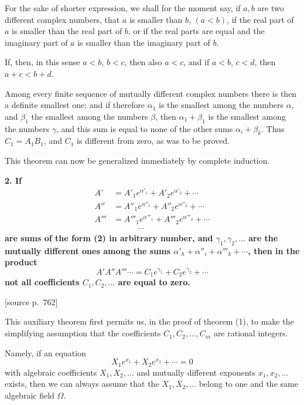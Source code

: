 \documentclass[11pt]{article}
\newcommand{\srcpage}[1]{\par\medskip\noindent\textsf{[source p.~#1]}\par\smallskip}
\begin{document}
For the sake of shorter expression, we shall for the moment say, if $a,b$ are two different complex numbers, that $a$ is smaller than $b$, $(a<b)$, if the real part of $a$ is smaller than the real part of $b$, or if the real parts are equal and the imaginary part of $a$ is smaller than the imaginary part of $b$.

If, then, in this sense $a<b$, $b<c$, then also $a<c$, and if $a<b$, $c<d$, then $a+c<b+d$.

Among every finite sequence of mutually different complex numbers there is then a definite smallest one; and if therefore $\alpha_1$ is the smallest among the numbers $\alpha$, and $\beta_1$ the smallest among the numbers $\beta$, then $\alpha_1+\beta_1$ is the smallest among the numbers $\gamma$, and this sum is equal to none of the other sums $\alpha_i+\beta_k$. Thus $C_1=A_1B_1$, and $C_1$ is different from zero, as was to be proved.

This theorem can now be generalized immediately by complete induction.

\textbf{2. If}
\[
\begin{aligned}
A'&=A'_1e^{\alpha'_1}+A'_2e^{\alpha'_2}+\cdots\\
A''&=A''_1e^{\alpha''_1}+A''_2e^{\alpha''_2}+\cdots\\
A'''&=A'''_1e^{\alpha'''_1}+A'''_2e^{\alpha'''_2}+\cdots\\
&\hspace{3em}\cdots
\end{aligned}
\]
\textbf{are sums of the form (2) in arbitrary number, and $\gamma_1,\gamma_2,\ldots$ are the mutually different ones among the sums $\alpha'_h+\alpha''_i+\alpha'''_k+\cdots$, then in the product}
\begin{equation}\tag{4}
A'A''A'''\cdots=C_1e^{\gamma_1}+C_2e^{\gamma_2}+\cdots
\end{equation}
\textbf{not all coefficients $C_1,C_2,\ldots$ are equal to zero.}

\srcpage{762}
This auxiliary theorem first permits us, in the proof of theorem (1), to make the simplifying assumption that the coefficients $C_1,C_2,\ldots,C_m$ are rational integers.

Namely, if an equation
\begin{equation}\tag{5}
X_1e^{x_1}+X_2e^{x_2}+\cdots=0
\end{equation}
with algebraic coefficients $X_1,X_2,\ldots$ and mutually different exponents $x_1,x_2,\ldots$ exists, then we can always assume that the $X_1,X_2,\ldots$ belong to one and the same algebraic field $\Omega$.
\end{document}
